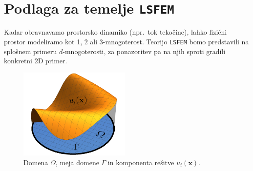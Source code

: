 \section{Podlaga za temelje \texttt{LSFEM}}

Kadar obravnavamo prostorsko dinamiko (npr.\ tok tekočine), lahko fizični prostor modeliramo kot 1, 2 ali 3-mnogoterost. Teorijo \texttt{LSFEM} bomo predstavili na splošnem primeru $d$-mnogoterosti, za ponazoritev pa na njih sproti gradili konkretni 2D primer.

\begin{figure}
	\vspace{-3mm}
	\centering
	\captionsetup{type=figure}
	\includegraphics[width=5.5cm]{Slike/funkcijaInDomenaG}
	\caption{Domena $\Omega$, meja domene $\Gamma$ in komponenta rešitve $u_i(\mathbf{x})$.}
\label{fig:funkInDom}
\vspace{0.2cm}
\end{figure}


